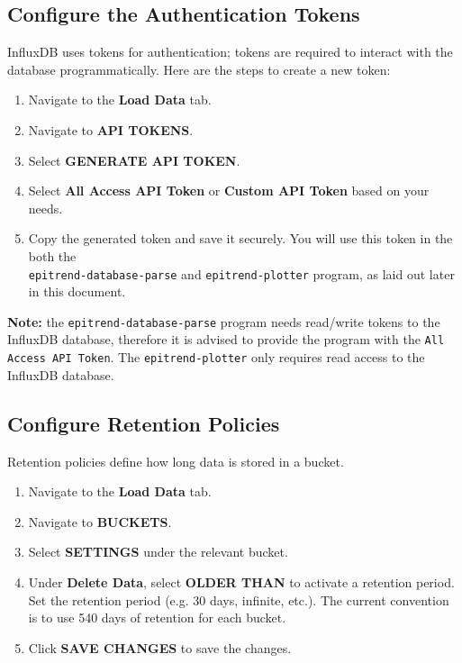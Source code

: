 \documentclass{article}
\begin{document}
\subsection{Configure the Authentication Tokens}
InfluxDB uses tokens for authentication; tokens are required to interact with the database programmatically. Here are the steps to create a new token:

\begin{enumerate}
    \item Navigate to the \textbf{Load Data} tab.
    \item Navigate to \textbf{API TOKENS}.
    \item Select \textbf{GENERATE API TOKEN}.
    \item Select \textbf{All Access API Token} or \textbf{Custom API Token} based on your needs.
    \item Copy the generated token and save it securely. You will use this token in the both the \\ \texttt{epitrend-database-parse} and \texttt{epitrend-plotter} program, as laid out later in this document.
\end{enumerate}

\noindent
\textbf{Note:} the \texttt{epitrend-database-parse} program needs read/write tokens to the InfluxDB database, therefore it is advised to provide the program with the \texttt{All Access API Token}. The \texttt{epitrend-plotter} only requires read access to the InfluxDB database.

\subsection{Configure Retention Policies}
Retention policies define how long data is stored in a bucket.

\begin{enumerate}
    \item Navigate to the \textbf{Load Data} tab.
    \item Navigate to \textbf{BUCKETS}.
    \item Select \textbf{SETTINGS} under the relevant bucket.
    \item Under \textbf{Delete Data}, select \textbf{OLDER THAN} to activate a retention period. Set the retention period (e.g. 30 days, infinite, etc.). The current convention is to use 540 days of retention for each bucket. 
    \item Click \textbf{SAVE CHANGES} to save the changes.
\end{enumerate}
\end{document}
